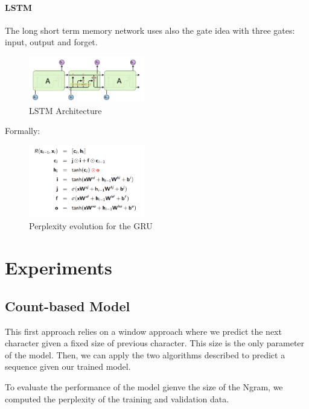 \documentclass[11pt]{article}
\begin{document}
\paragraph{LSTM}

The long short term memory network uses also the gate idea with three gates: input, output and forget.

\begin{figure}[H]
\begin{center}
    \includegraphics[width=0.45\textwidth]{lstm.png}
    \caption{LSTM Architecture}
\end{center}
\end{figure}

Formally:

\begin{figure}[H]
\begin{center}
    \includegraphics[width=0.45\textwidth]{lstm_eq.png}
    \caption{Perplexity evolution for the GRU}
\end{center}
\end{figure}


\section{Experiments}

\subsection{Count-based Model}

This first approach relies on a window approach where we predict the next character given a fixed size of previous character. This size is the only parameter of the model. Then, we can apply the two algorithms described to predict a sequence given our trained model. 

To evaluate the performance of the model gienve the size of the Ngram, we computed the perplexity of the training and validation data.
\end{document}
